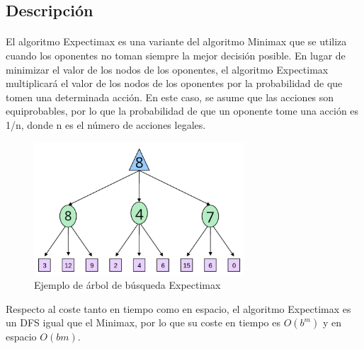 \documentclass{report}
\begin{document}
        \subsection*{Descripción}
          \paragraph*{}{
            El algoritmo Expectimax es una variante del algoritmo Minimax que se utiliza cuando los oponentes no toman siempre la mejor decisión posible.
            En lugar de minimizar el valor de los nodos de los oponentes, el algoritmo Expectimax multiplicará el valor de los nodos de los oponentes por la probabilidad de que tomen una determinada acción.
            En este caso, se asume que las acciones son equiprobables, por lo que la probabilidad de que un oponente tome una acción es 1/n, donde n es el número de acciones legales.
            
            \begin{figure}[H]
                \centering
                \includegraphics[width=0.7\textwidth]{./.img/expectimax.png}
                \caption{Ejemplo de árbol de búsqueda Expectimax}
            \end{figure}

            Respecto al coste tanto en tiempo como en espacio, el algoritmo Expectimax es un DFS igual que el Minimax, por lo que su coste en tiempo es $O(b^m)$ y en espacio $O(bm)$.
          }
\end{document}
